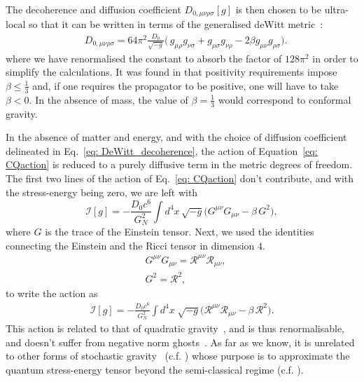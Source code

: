 \documentclass[aps,pra,amsmath,amssymb,amsthm,floatfix,nofootinbib,notitlepage,superscriptaddress,10pt]{revtex4-2}
\begin{document}
The decoherence and diffusion coefficient $D_{0,\mu\nu\rho\sigma}[g]$ is then chosen to be ultra-local so that it can be written in terms of the generalised deWitt metric~\cite{dewitt_1967,giulini_kiefer_1994}:
\begin{equation}
	\label{eq: DeWitt_decoherence}
	\begin{split}
		&D_{0,\mu \nu \rho \sigma}=64 \pi^2\frac{D_0}{\sqrt{-g}}\big(\,g_{\mu\rho} g_{\nu \sigma}+g_{\mu \sigma} g_{\nu \rho}-2\beta g_{\mu\nu} g_{\rho \sigma}\big).
	\end{split}    
\end{equation}
where we have renormalised the constant to absorb the factor of $128 \pi^2$ in order to simplify the calculations. 
It was found in \cite{grudka2023renormalisable} that positivity requirements impose $\beta \leq\frac{1}{3}$ and, if one requires the propagator to be positive, one will have to take $\beta < 0$. In the absence of mass, the value of $\beta = \frac{1}{3}$ would correspond to conformal gravity.

In the absence of matter and energy, and with the choice of diffusion coefficient delineated in Eq.~\eqref{eq: DeWitt_decoherence}, the action of Equation~\eqref{eq: CQaction} is reduced to a purely diffusive term in the metric degrees of freedom. The first two lines of the action of Eq.~\eqref{eq: CQaction} don't contribute, and with the stress-energy being zero, we are left with
\begin{equation}
	\mathcal{I}[g]=-\frac{ D_0 c^6}{G_N^2}\int d^4x\, \sqrt{-g} \Big(G^{\mu\nu}G_{\mu\nu} - \beta\, G^2 \Big),
	\label{eq: actionG}
\end{equation}
where $G$ is the trace of the Einstein tensor. Next, we used the identities connecting the Einstein and the Ricci tensor in dimension $4$.
\begin{align}
	&G^{\mu\nu}G_{\mu\nu}=\mathcal{R}^{\mu\nu}\mathcal{R}_{\mu\nu}, \nonumber\\
	&G^2=\mathcal{R}^2,
\end{align}
to write the action as
\begin{equation}
	\begin{split}
		\mathcal{I}[g]=-\frac{ D_0 c^6}{G_N^2}\int d^4x\;\sqrt{-g}\Big(\mathcal{R}^{\mu\nu}\mathcal{R}_{\mu\nu}-\beta\,\mathcal{R}^2 \Big).
		\label{eq: actionR}
	\end{split}
\end{equation}
This action is related to that of quadratic gravity~\cite{stelle1977renormalization,stelle1978classical,SalvioQuadratic18,donoghue2021quadratic}, and is thus renormalisable, and doesn't suffer from negative norm ghosts~\cite{grudka2023renormalisable}. As far as we know, it is unrelated to other forms of stochastic gravity~\cite{hu2008stochastic} (c.f. \cite{moffat1997stochastic}) whose purpose is to approximate the quantum stress-energy tensor beyond the semi-classical regime (c.f. \cite{UCL2022semi}).
\end{document}
